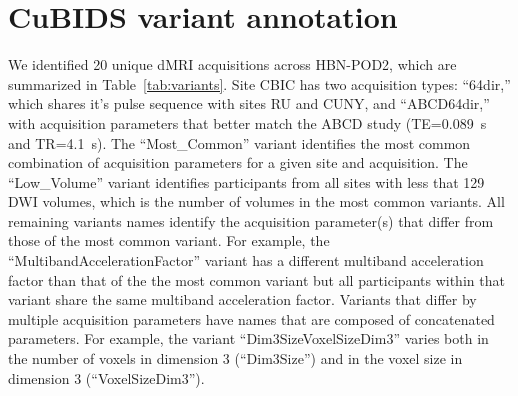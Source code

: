 \documentclass[9pt,lineno]{elife}
\begin{document}
\appendix
\begin{appendixbox}
\label{app:variants}
\section{CuBIDS variant annotation}

We identified 20 unique dMRI acquisitions across HBN-POD2, which are summarized in Table~\ref{tab:variants}. Site CBIC has two acquisition types: ``64dir,'' which shares it's pulse sequence with sites RU and CUNY, and ``ABCD64dir,'' with acquisition parameters that better match the ABCD study (TE=\qty{0.089}{\second} and TR=\qty{4.1}{\second}). The ``Most\_Common'' variant identifies the most common combination of acquisition parameters for a given site and acquisition. The ``Low\_Volume'' variant identifies participants from all sites with less that 129 DWI volumes, which is the number of volumes in the most common variants. All remaining variants names identify the acquisition parameter(s) that differ from those of the most common variant. For example, the ``MultibandAccelerationFactor'' variant has a different multiband acceleration factor than that of the the most common variant but all participants within that variant share the same multiband acceleration factor. Variants that differ by multiple acquisition parameters have names that are composed of concatenated parameters. For example, the variant ``Dim3SizeVoxelSizeDim3'' varies both in the number of voxels in dimension 3 (``Dim3Size'') and in the voxel size in dimension 3 (``VoxelSizeDim3'').


\end{appendixbox}
\end{document}
